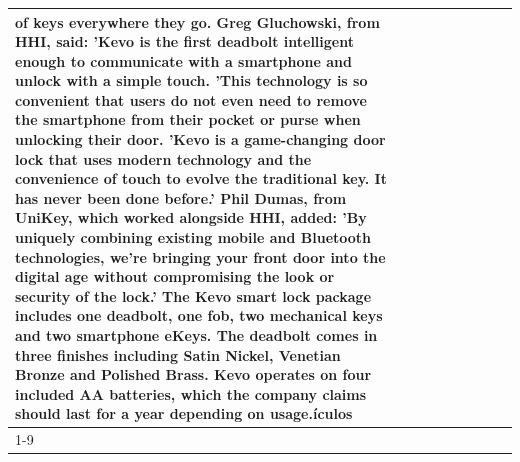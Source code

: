 \begin{table}[H]
\begin{tabular}{lllrlllll}
of keys everywhere they go. Greg Gluchowski, from HHI, said: 'Kevo is the first deadbolt intelligent enough to communicate with a smartphone and unlock with a simple touch. 'This technology is so convenient that users do not even need to remove the smartphone from their pocket or purse when unlocking their door. 'Kevo is a game-changing door lock that uses modern technology and the convenience of touch to evolve the traditional key. It has never been done before.' Phil Dumas, from UniKey, which worked alongside HHI, added: 'By uniquely combining existing mobile and Bluetooth technologies, we’re bringing your front door into the digital age without compromising the look or security of the lock.' The Kevo smart lock package includes one deadbolt, one fob, two mechanical keys and two smartphone eKeys. The deadbolt comes in three finishes including Satin Nickel, Venetian Bronze and Polished Brass. Kevo operates on four included AA batteries, which the company claims should last for a year depending on usage.ículos \\
\cline{1-9}

\end{tabular}
\end{table}
